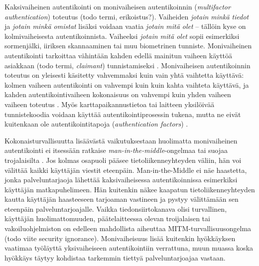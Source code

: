 \documentclass[finnish,gradu]{tktltiki}
\begin{document}
  Kaksivaiheinen autentikointi on monivaiheisen autentikoinnin (\emph{multifactor authentication}) toteutus (todo termi, erikoistus?).
  Vaiheiden \emph{jotain minkä tiedot} ja \emph{jotain minkä omistat} lisäksi voidaan vaatia \emph{jotain mitä olet} -- tällöin kyse on kolmivaiheisesta autentikoinnista. Vaiheeksi \emph{jotain mitä olet} sopii esimerkiksi sormenjälki, iiriksen skannaaminen tai muu biometrinen tunniste. Monivaiheinen autentikointi tarkoittaa vähintään kahden edellä mainitun vaiheen käyttöä asiakkaan (todo termi, \emph{claimant}) tunnistamiseksi \cite{NIST_SP800-63-1}. Monivaiheisen autentikoinnin toteutus on yleisesti käsitetty vahvemmaksi kuin vain yhtä vaihtetta käyttävä: kolmen vaiheen autentikointi on vahvempi kuin kuin kahta vaihteta käyttävä, ja kahden autentikointivaiheen kokonaisuus on vahvempi kuin yhden vaiheen vaiheen toteutus \cite{NIST_SP800-63-1}. Myös karttapaikannustietoa tai laitteen yksilöivää tunnistekoodia voidaan käyttää autentikointiprosessin tukena, mutta ne eivät kuitenkaan ole autentikointitapoja (\emph{authentication factors}) \cite{NIST_SP800-63-1}.

  Kokonaisturvallisuutta lisäävästä vaikutuksestaan huolimatta monivaiheinen autentikointi ei itsessään ratkaise \emph{man-in-the-middle}-ongelmaa tai suojaa trojalaisilta \cite{schneier_2factor_2005}. Jos kolmas osapuoli pääsee tietoliikenneyhteyden väliin, hän voi välittää kaikki käyttäjän viestit eteenpäin. Man-in-the-Middle ei näe haastetta, jonka palveluntarjaoja lähettää kaksivaiheisessa autentikoinnissa esimerkiksi käyttäjän matkapuhelimeen. Hän kuitenkin näkee kaapatun tietoliikenneyhteyden kautta käyttäjän haasteeseen tarjoaman vastineen ja pystyy välittämään sen eteenpäin palveluntarjoajalle. Vaikka tiedonsiirtokanava olisi turvallinen, käyttäjän huolimattomuuden, päätelaitteessa olevan troijalaisen tai vakoiluohjelmiston on edelleen mahdollista aiheuttaa MITM-turvallisuusongelma~\cite{schneier_2factor_2012} (todo viite security ignorance). Monivaiheisuus lisää kuitenkin hyökkäyksen vaatimaa työläyttä yksivaiheiseen autentikointiin verrattuna, muun muassa koska hyökkäys täytyy kohdistaa tarkemmin tiettyä palveluntarjoajaa vastaan.


\end{document}
